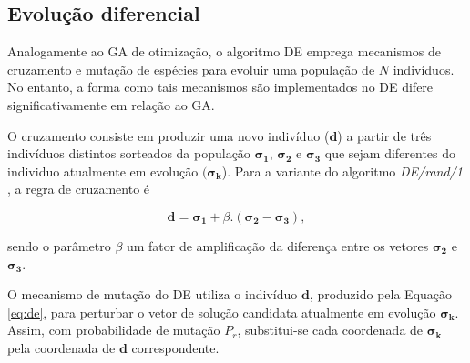 \subsection{Evolução diferencial}

Analogamente ao \ac{GA} de otimização, o algoritmo \acf{DE} \cite{Storn:1996} emprega mecanismos de cruzamento e mutação de espécies para evoluir uma população de $N$ indivíduos. No entanto, a forma como tais mecanismos são implementados no \ac{DE} difere significativamente em relação ao \ac{GA}. 

O cruzamento consiste em produzir uma novo indivíduo ($\mathbf{d}$) a partir de três indivíduos distintos sorteados da população $\boldsymbol{\sigma_1}$, $\boldsymbol{\sigma_2}$ e $\boldsymbol{\sigma_3}$ que sejam diferentes do individuo atualmente em evolução $(\boldsymbol{\sigma_k}$). Para a variante do algoritmo \emph{DE/rand/1} \cite{Storn:1996}, a regra de cruzamento é  

\noindent
\begin{equation}
\label{eq:de}
\boldsymbol{d} = \boldsymbol{\sigma_1} + \beta.(\boldsymbol{\sigma_2} - \boldsymbol{\sigma_3}),
\end{equation}

\noindent sendo o parâmetro $\beta$ um fator de amplificação da diferença entre os vetores $\boldsymbol{\sigma_2}$ e $\boldsymbol{\sigma_3}$.

O mecanismo de mutação do \ac{DE} utiliza o indivíduo $\boldsymbol{d}$, produzido pela Equação \ref{eq:de}, para perturbar o vetor de solução candidata atualmente em evolução $\boldsymbol{\sigma_k}$. Assim, com probabilidade de mutação $P_r$, substitui-se cada coordenada de $\boldsymbol{\sigma_k}$ pela coordenada de $\boldsymbol{d}$ correspondente.

